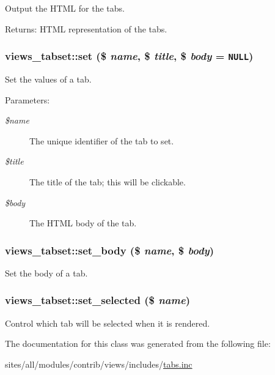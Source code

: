 Output the HTML for the tabs.

\begin{Desc}
\item[Returns:]HTML representation of the tabs. \end{Desc}
\hypertarget{classviews__tabset_6a74f667b324b252c1ce316df2974c66}{
\subsubsection[{set}]{\setlength{\rightskip}{0pt plus 5cm}views\_\-tabset::set (\$ {\em name}, \/  \$ {\em title}, \/  \$ {\em body} = {\tt NULL})}}
\label{classviews__tabset_6a74f667b324b252c1ce316df2974c66}


Set the values of a tab.

\begin{Desc}
\item[Parameters:]
\begin{description}
\item[{\em \$name}]The unique identifier of the tab to set. \item[{\em \$title}]The title of the tab; this will be clickable. \item[{\em \$body}]The HTML body of the tab. \end{description}
\end{Desc}
\hypertarget{classviews__tabset_8113b59319c48a6813e93540935fd6d6}{
\subsubsection[{set\_\-body}]{\setlength{\rightskip}{0pt plus 5cm}views\_\-tabset::set\_\-body (\$ {\em name}, \/  \$ {\em body})}}
\label{classviews__tabset_8113b59319c48a6813e93540935fd6d6}


Set the body of a tab. \hypertarget{classviews__tabset_2d39109f3630ad7d26ff2078ba465dea}{
\subsubsection[{set\_\-selected}]{\setlength{\rightskip}{0pt plus 5cm}views\_\-tabset::set\_\-selected (\$ {\em name})}}
\label{classviews__tabset_2d39109f3630ad7d26ff2078ba465dea}


Control which tab will be selected when it is rendered. 

The documentation for this class was generated from the following file:\begin{CompactItemize}
\item 
sites/all/modules/contrib/views/includes/\hyperlink{tabs_8inc}{tabs.inc}\end{CompactItemize}
